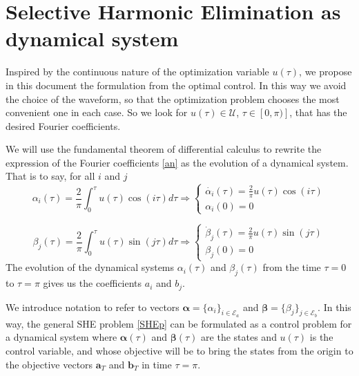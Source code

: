 \section{Selective Harmonic Elimination as dynamical system}\label{Section3}

Inspired by the continuous nature of the optimization variable $u(\tau)$, we propose in this document the formulation from the optimal control. In this way we avoid the choice of the waveform, so that the optimization problem chooses the most convenient one in each case. So we look for $u (\tau)\in \mathcal{U}$, $\tau \in [0,\pi)]$, that has the desired Fourier coefficients.

We will use the fundamental theorem of differential calculus to rewrite the expression of the Fourier coefficients \eqref{an} as the evolution of a dynamical system. That is to say, for all $i$ and $j$
\begin{equation*}
    \alpha_i(\tau) = \frac{2}{\pi}\int_0^\tau u(\tau) \cos(i\tau)d\tau 
    \Rightarrow
    \begin{cases} \label{ode}
        \dot{\alpha_i}(\tau)  = \frac{2}{\pi}u(\tau)\cos(i\tau) \\  
        \alpha_i(0)  = 0       
    \end{cases}
\end{equation*}

\begin{equation*}
    \beta_j(\tau) = \frac{2}{\pi}\int_0^\tau u(\tau) \sin(j\tau)d\tau 
    \Rightarrow
    \begin{cases} \label{ode}
        \dot{\beta}_j(\tau)  = \frac{2}{\pi}u(\tau)\sin(j\tau) \\  
        \beta_j(0) = 0       
    \end{cases}
\end{equation*}
The evolution of the dynamical systems $\alpha_i(\tau)$ and $\beta_j(\tau) $ from the time $\tau = 0 $ to $\tau = \pi$ gives us the coefficients $a_i$ and $b_j$.

We introduce notation to refer to vectors $\bm{\alpha} = \{\alpha_i\}_{i\in\mathcal{E}_a}$ and $\bm{\beta} = \{\beta_j\}_{j\in\mathcal{E}_b}$.
%
In this way, the general SHE problem \eqref{SHEp} can be formulated as a control problem for a dynamical system where $\bm{\alpha}(\tau)$ and $\bm{\beta}(\tau)$ are the states and $u(\tau)$ is the control variable, and whose objective will be to bring the states from the origin to the objective vectors $\bm{a}_T$ and $\bm{b}_T $ in time $\tau = \pi$.

